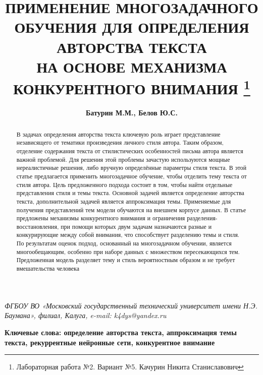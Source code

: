 \documentclass{article}
\begin{document}
\addtolength{\topmargin}{-28mm}
\addtolength{\textheight}{45mm}

\title{
    \textbf{{ПРИМЕНЕНИЕ МНОГОЗАДАЧНОГО ОБУЧЕНИЯ}
    {ДЛЯ ОПРЕДЕЛЕНИЯ АВТОРСТВА ТЕКСТА} \\
    {НА ОСНОВЕ МЕХАНИЗМА КОНКУРЕНТНОГО ВНИМАНИЯ}}
    \thanks{Лабораторная работа №2. Вариант №5. Качурин Никита Станиславович}
}
\author{\textbf{Батурин М.М., Белов Ю.С.}}
\date{} 

\maketitle

\textit {ФГБОУ ВО «Московский государственный технический университет имени Н.Э. Баумана», 
филиал, Калуга, e-mail: k4dys@yandex.ru}

\begin{abstract}
    В задачах определения авторства текста ключевую роль играет представление независящего от тематики произведения личного стиля автора. Таким образом, отделение содержания текста от стилистических 
особенностей письма автора является важной проблемой. Для решения этой проблемы зачастую используются мощные нереалистичные решения, либо вручную определённые параметры стиля текста. В этой 
статье предлагается применить многозадачное обучение, чтобы отделить тему текста от стиля автора. Цель 
предложенного подхода состоит в том, чтобы найти отдельные представления стиля и темы текста. 
Основной задачей является определение авторства текста, дополнительной задачей является аппроксимация темы. 
Применяемые для получения представлений тем модели обучаются на внешнем корпусе данных. В статье 
предложены механизмы конкурентного внимания и ограничения разделения-восстановления, при помощи 
которых двум задачам назначаются разные и конкурирующие между собой внимания, что способствует разделению темы и стиля. По результатам оценок подход, основанный на многозадачном обучении, является 
многообещающим, особенно при наборе данных с множеством пересекающихся тем. Предложенная модель 
разделяет тему и стиль вероятностным образом и не требует вмешательства человека
\end{abstract}
\textbf{Ключевые слова: определение авторства текста, аппроксимация темы текста, рекуррентные нейронные сети, 
конкурентное внимание}
\end{document}

